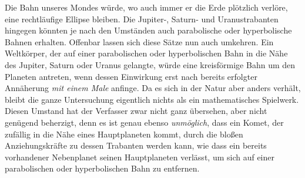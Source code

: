 Die Bahn unseres Mondes würde, wo auch immer er die Erde plötzlich verlöre, eine rechtläufige Ellipse bleiben. Die Jupiter-, Saturn- und Uranustrabanten hingegen könnten je nach den Umständen auch parabolische oder hyperbolische Bahnen erhalten.
Offenbar lassen sich diese Sätze nun auch umkehren. Ein Weltkörper, der auf einer parabolischen oder hyperbolischen Bahn in die Nähe des Jupiter, Saturn oder Uranus gelangte, würde eine kreisförmige Bahn um den Planeten antreten, wenn dessen Einwirkung erst nach bereits erfolgter Annäherung \emph{mit einem Male} anfinge.
Da es sich in der Natur aber anders verhält, bleibt die ganze Untersuchung eigentlich nichts als ein mathematisches Spielwerk.
Diesen Umstand hat der Verfasser zwar nicht ganz übersehen, aber nicht genügend beherzigt, denn es ist genau ebenso \emph{unmöglich}, dass ein Komet, der zufällig in die Nähe eines Hauptplaneten kommt, durch die bloßen Anziehungskräfte zu dessen Trabanten werden kann, wie dass ein bereits vorhandener Nebenplanet seinen Hauptplaneten verlässt, um sich auf einer parabolischen oder hyperbolischen Bahn zu entfernen.
\par\clearpage\endgroup
